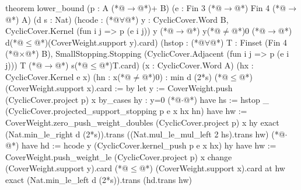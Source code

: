 theorem lower_bound (p : A (*@$\to$@*)+ B) (e : Fin 3 (*@$\to$@*) Fin 4 (*@$\to$@*) A) (d s : Nat)
    (hcode : (*@$\forall$@*) y : CyclicCover.Word B, CyclicCover.Kernel (fun i j => p (e i j)) y (*@$\to$@*)
      y(*@$\ne$@*)0 (*@$\to$@*) d(*@$\le$@*)(CoverWeight.support y).card)
    (hstop : (*@$\forall$@*) T : Finset (Fin 4 (*@$\times$@*) B), SmallStopping.Stopping
      (CyclicCover.Adjacent (fun i j => p (e i j))) T (*@$\to$@*) s(*@$\le$@*)T.card)
    (x : CyclicCover.Word A) (hx : CyclicCover.Kernel e x) (hn : x(*@$\ne$@*)0) :
    min d (2*s) (*@$\le$@*) (CoverWeight.support x).card := by
  let y := CoverWeight.push (CyclicCover.project p) x
  by_cases hy : y=0
  (*@$\cdot$@*) have hs := hstop _ (CyclicCover.projected_support_stopping p e x hx hn)
    have hw := CoverWeight.zero_push_weight_doubles (CyclicCover.project p) x hy
    exact (Nat.min_le_right d (2*s)).trans ((Nat.mul_le_mul_left 2 hs).trans hw)
  (*@$\cdot$@*) have hd := hcode y (CyclicCover.kernel_push p e x hx) hy
    have hw := CoverWeight.push_weight_le (CyclicCover.project p) x
    change (CoverWeight.support y).card (*@$\le$@*) (CoverWeight.support x).card at hw
    exact (Nat.min_le_left d (2*s)).trans (hd.trans hw)
